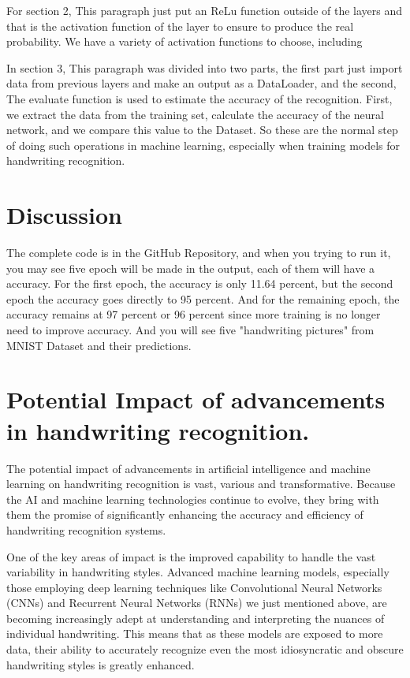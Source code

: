 \documentclass[12pt]{article}
\begin{document}
For section 2, This paragraph just put an ReLu function outside of the layers and that is the activation function of the layer to ensure to produce the real probability. We have a variety of activation functions to choose, including 

In section 3, This paragraph was divided into two parts, the first part just import data from previous layers and make an output as a DataLoader, and the second, The evaluate function is used to estimate the accuracy of the recognition. First, we extract the data from the training set, calculate the accuracy of the neural network, and we compare this value to the Dataset. So these are the normal step of doing such operations in machine learning, especially when training models for handwriting recognition. 

\section*{Discussion}
The complete code is in the GitHub Repository, and when you trying to run it, you may see five epoch will be made in the output, each of them will have a accuracy. For the first epoch, the accuracy is only 11.64 percent, but the second epoch the accuracy goes directly to 95 percent. And for the remaining epoch, the accuracy remains at 97 percent or 96 percent since more training is no longer need to improve accuracy. And you will see five "handwriting pictures" from MNIST Dataset and their predictions. 

\section* {Potential Impact of advancements in handwriting recognition.}
The potential impact of advancements in artificial intelligence and machine learning on handwriting recognition is vast, various and transformative. Because the AI and machine learning technologies continue to evolve, they bring with them the promise of significantly enhancing the accuracy and efficiency of handwriting recognition systems. 

One of the key areas of impact is the improved capability to handle the vast variability in handwriting styles. Advanced machine learning models, especially those employing deep learning techniques like Convolutional Neural Networks (CNNs) and Recurrent Neural Networks (RNNs) we just mentioned above, are becoming increasingly adept at understanding and interpreting the nuances of individual handwriting. This means that as these models are exposed to more data, their ability to accurately recognize even the most idiosyncratic and obscure handwriting styles is greatly enhanced.\cite{Advances}
\end{document}
